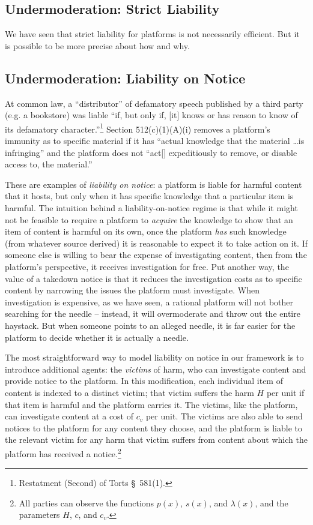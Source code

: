 \subsection{Undermoderation: Strict Liability}

We have seen that strict liability for platforms is not necessarily efficient. But it is possible to be more precise about how and why.




\subsection{Undermoderation: Liability on Notice}

At common law, a ``distributor'' of defamatory speech published by a third party (e.g. a bookstore) was liable ``if, but only if, [it] knows or has reason to know of its defamatory character.''\footnote{Restatment (Second) of Torts §~581(1).}  Section 512(c)(1)(A)(i) removes a platform's immunity as to specific material if it has ``actual knowledge that the material \ldots is infringing'' and the platform does not ``act[] expeditiously to remove, or disable access to, the material.''

These are examples of \emph{liability on notice}: a platform is liable for harmful content that it hosts, but only when it has specific knowledge that a particular item is harmful. The intuition behind a liability-on-notice regime is that while it might not be feasible to require a platform to \emph{acquire} the knowledge to show that an item of content is harmful on its own, once the platform \emph{has} such knowledge (from whatever source derived) it is reasonable to expect it to take action on it. If someone else is willing to bear the expense of investigating content, then from the platform's perspective, it receives investigation for free. Put another way, the value of a takedown notice is that it reduces the investigation costs as to specific content by narrowing the issues the platform must investigate. When investigation is expensive, as we have seen, a rational platform will not bother searching for the needle -- instead, it will overmoderate and throw out the entire haystack. But when someone points to an alleged needle, it is far easier for the platform to decide whether it is actually a needle.

The most straightforward way to model liability on notice in our framework is to introduce additional agents: the \emph{victims} of harm, who can investigate content and provide notice to the platform. In this modification, each individual item of content is indexed to a distinct victim; that victim suffers the harm $H$ per unit if that item is harmful and the platform carries it. The victims, like the platform, can investigate content at a cost of $c_v$ per unit. The victims are also able to send notices to the platform for any content they choose, and the platform is liable to the relevant victim for any harm that victim suffers from content about which the platform has received a notice.\footnote{All parties can observe the functions $p(x)$, $s(x)$, and $\lambda(x)$, and the parameters $H$, $c$, and $c_v$.}


